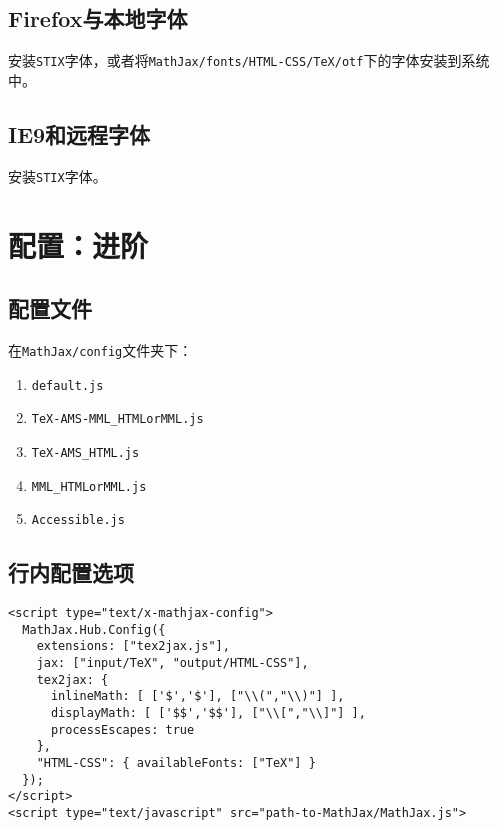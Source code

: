 \documentclass{article}
\begin{document}
\subsection{Firefox与本地字体}
安装\verb!STIX!字体，或者将\verb!MathJax/fonts/HTML-CSS/TeX/otf!下的字体安装到系统中。
\subsection{IE9和远程字体}
安装\verb!STIX!字体。
\section{配置：进阶}
\subsection{配置文件}
在\verb!MathJax/config!文件夹下：
\begin{enumerate}
\item \verb!default.js!
\item \verb!TeX-AMS-MML_HTMLorMML.js!
\item \verb!TeX-AMS_HTML.js!
\item \verb!MML_HTMLorMML.js!
\item \verb!Accessible.js!
\end{enumerate}
\subsection{行内配置选项}
\begin{verbatim}
<script type="text/x-mathjax-config">
  MathJax.Hub.Config({
    extensions: ["tex2jax.js"],
    jax: ["input/TeX", "output/HTML-CSS"],
    tex2jax: {
      inlineMath: [ ['$','$'], ["\\(","\\)"] ],
      displayMath: [ ['$$','$$'], ["\\[","\\]"] ],
      processEscapes: true
    },
    "HTML-CSS": { availableFonts: ["TeX"] }
  });
</script>
<script type="text/javascript" src="path-to-MathJax/MathJax.js">
\end{verbatim}
\end{document}
